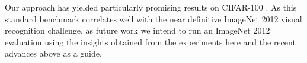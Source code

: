 \documentclass{article}
\begin{document}
Our approach has yielded particularly promising results on CIFAR-100%
. As this standard benchmark correlates well with the near definitive ImageNet 2012 visual recognition challenge, as future work we intend to run an ImageNet 2012 evaluation using the insights obtained from the experiments here and the recent advances above as a guide. 





%



\end{document}
